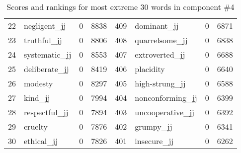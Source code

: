 \begin{table}[tbp]
\begin{tabular}{| rlr@{.}l | rlr@{.}l |}
    22 & negligent\_jj & 0 & 8838    &    409 & dominant\_jj & 0 & 6871 \\
    23 & truthful\_jj & 0 & 8806    &    408 & quarrelsome\_jj & 0 & 6838 \\
    24 & systematic\_jj & 0 & 8553    &    407 & extroverted\_jj & 0 & 6688 \\
    25 & deliberate\_jj & 0 & 8419    &    406 & placidity & 0 & 6640 \\
    26 & modesty & 0 & 8297    &    405 & high-strung\_jj & 0 & 6588 \\
    27 & kind\_jj & 0 & 7994    &    404 & nonconforming\_jj & 0 & 6399 \\
    28 & respectful\_jj & 0 & 7894    &    403 & uncooperative\_jj & 0 & 6392 \\
    29 & cruelty & 0 & 7876    &    402 & grumpy\_jj & 0 & 6341 \\
    30 & ethical\_jj & 0 & 7826    &    401 & insecure\_jj & 0 & 6262 \\
    \hline
    \end{tabular}
    \caption{Scores and rankings for most extreme 30 words in component \#4} 
\end{table}
\clearpage
